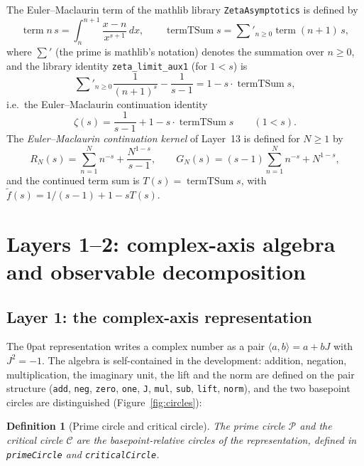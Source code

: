 \documentclass{article}
\newtheorem{definition}[theorem]{Definition}
\newcommand{\zt}{\zeta}
\newcommand{\tsum}{\textstyle\sum'}
\begin{document}
The Euler--Maclaurin term of the mathlib library \texttt{ZetaAsymptotics} is
defined by
\[
\operatorname{term} n\,s=\int_n^{n+1}\frac{x-n}{x^{s+1}}\,dx,\qquad
\operatorname{termTSum} s=\tsum_{n\ge 0}\operatorname{term}(n+1)\,s,
\]
where $\tsum$ (the prime is mathlib's notation) denotes the summation
over $n\ge 0$, and
the library identity \texttt{zeta\_limit\_aux1} (for $1<s$) is
\[
\tsum_{n\ge 0}\frac{1}{(n+1)^s}-\frac{1}{s-1}=1-s\cdot\operatorname{termTSum} s,
\]
i.e.\ the Euler--Maclaurin continuation identity
\begin{equation}
\label{eq:em}
\zt(s)=\frac{1}{s-1}+1-s\cdot\operatorname{termTSum} s\qquad(1<s).
\end{equation}
The \emph{Euler--Maclaurin continuation kernel} of Layer~13 is defined for
$N\ge 1$ by
\begin{equation}
\label{eq:kernel}
R_N(s)=\sum_{n=1}^{N}n^{-s}+\frac{N^{1-s}}{s-1},\qquad
G_N(s)=(s-1)\sum_{n=1}^{N}n^{-s}+N^{1-s},
\end{equation}
and the continued term sum is $T(s)=\operatorname{termTSum} s$, with
$\tilde f(s)=1/(s-1)+1-sT(s)$.

\section{Layers 1--2: complex-axis algebra and observable decomposition}
\label{sec:L1}

\subsection{Layer 1: the complex-axis representation}
\label{sec:L1a}

The 0pat representation writes a complex number as a pair
$\langle a,b\rangle=a+bJ$ with $J^2=-1$. The algebra is self-contained in
the development: addition, negation, multiplication, the imaginary unit, the
lift and the norm are defined on the pair structure
(\texttt{add}, \texttt{neg}, \texttt{zero}, \texttt{one}, \texttt{J},
\texttt{mul}, \texttt{sub}, \texttt{lift}, \texttt{norm}), and the two
basepoint circles are distinguished (Figure~\ref{fig:circles}):

\begin{definition}[Prime circle and critical circle]
The \emph{prime circle} $\mathcal{P}$ and the \emph{critical circle}
$\mathcal{C}$ are the basepoint-relative circles of the representation,
defined in \texttt{primeCircle} and \texttt{criticalCircle}.
\end{definition}
\end{document}
